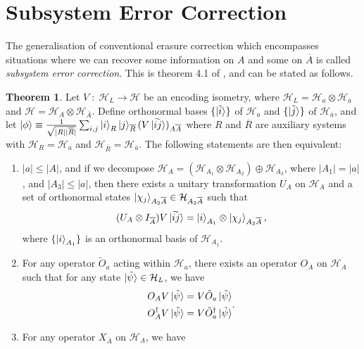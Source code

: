 \documentclass[12pt,a4paper]{report}
\numberwithin{equation}{section}
\newcommand{\ol}[1]{\overline{#1}}
\theoremstyle{definition}
\theoremstyle{theorem}
\newtheorem{theorem}{Theorem}[section]
\theoremstyle{theorem}
\theoremstyle{example}
\theoremstyle{definition}
\begin{document}
\section{Subsystem Error Correction}
The generalisation of conventional erasure correction which encompasses situations where we can recover some information on $A$ and some on $\ol{A}$ is called \textit{subsystem error correction}. This is theorem 4.1 of \cite{Harlow}, and can be stated as follows.
\begin{theorem}
	Let $V\;:\;\mathcal{H}_{L}\to\mathcal{H}$ be an encoding isometry, where $\mathcal{H}_{L}=\mathcal{H}_{a}\otimes\mathcal{H}_{\ol{a}}$ and $\mathcal{H}=\mathcal{H}_{A}\otimes\mathcal{H}_{\ol{A}}$. Define orthonormal bases $\{\ket{\tilde{i}}\}$ of $\mathcal{H}_{a}$ and $\{\ket{\tilde{j}}\}$ of $\mathcal{H}_{\ol{a}}$, and let $\ket{\phi}\equiv\frac{1}{\sqrt{|R||\ol{R}|}}\sum_{i,j}\ket{i}_{R}\ket{j}_{\ol{R}}(V\ket{\widetilde{ij}})_{A\ol{A}}$ where $R$ and $\ol{R}$ are auxiliary systems with $\mathcal{H}_{R}=\mathcal{H}_{a}$ and $\mathcal{H}_{\ol{R}}=\mathcal{H}_{\ol{a}}$. The following statements are then equivalent:
	\begin{enumerate}
		\item $|a|\leq|A|$, and if we decompose $\mathcal{H}_{A}=(\mathcal{H}_{A_{1}}\otimes\mathcal{H}_{A_{2}})\oplus\mathcal{H}_{A_{3}}$, where $|A_{1}|=|a|$, and $|A_{3}|\leq |a|$, then there exists a unitary transformation $U_{A}$ on $\mathcal{H}_{A}$ and a set of orthonormal states $\ket{\chi_{j}}_{A_{2}\ol{A}}\in\mathcal{H}_{A_{2}\ol{A}}$ such that
		\begin{equation}\label{S1}
			(U_{A}\otimes I_{\ol{A}})V\ket{\widetilde{ij}}=\ket{i}_{A_{1}}\otimes\ket{\chi_{j}}_{A_{2}\ol{A}},
		\end{equation}
		where $\{\ket{i}_{A_{1}}\}$ is an orthonormal basis of $\mathcal{H}_{A_{1}}$.
		\item For any operator $\tilde{O}_{a}$ acting within $\mathcal{H}_{a}$, there exists an operator $O_{A}$ on $\mathcal{H}_{A}$ such that for any state $\ket{\tilde{\psi}}\in\mathcal{H}_{L}$, we have
		\begin{equation}\label{S2}
			\begin{aligned}
				O_{A}V\ket{\tilde{\psi}}&=V\tilde{O}_{a}\ket{\tilde{\psi}}\\
				O_{A}^{\dagger}V\ket{\tilde{\psi}}&=V\tilde{O}_{a}^{\dagger}\ket{\tilde{\psi}}
			\end{aligned}.
		\end{equation}
		\item For any operator $X_{\ol{A}}$ on $\mathcal{H}_{A}$, we have

\end{enumerate}
\end{theorem}
\end{document}
